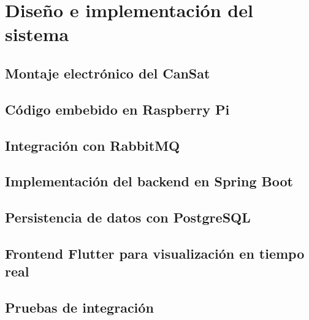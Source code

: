 \chapter{Diseño e implementación del sistema}
\section{Montaje electrónico del CanSat}
\section{Código embebido en Raspberry Pi}
\section{Integración con RabbitMQ}
\section{Implementación del backend en Spring Boot}
\section{Persistencia de datos con PostgreSQL}
\section{Frontend Flutter para visualización en tiempo real}
\section{Pruebas de integración}


